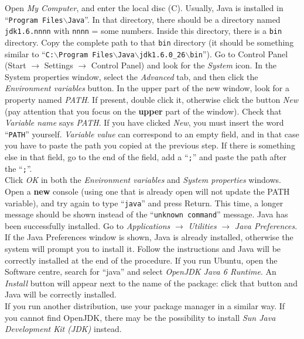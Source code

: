 \begin{enumerate}
{Open \emph{My Computer}, and enter the local disc (C). Usually, Java is installed in ``{\tt Program
Files$\backslash{}$Java}''. In that directory,
there should be a directory named {\tt jdk1.6.nnnn} with {\tt nnnn} = some numbers.
Inside this directory, there is a {\tt bin} directory. Copy the complete path to that {\tt bin} directory (it should be
something similar to
``{\tt C:$\backslash{}$Program Files$\backslash{}$Java$\backslash{}$jdk1.6.0\_{}26$\backslash{}$bin}'').
Go to Control Panel (Start $\rightarrow$ Settings $\rightarrow$ Control Panel) and look for the \emph{System} icon.
In the System properties window, select the \emph{Advanced} tab, and then click the \emph{Environment variables}
button.
In the upper part of the new window, look for a property named \emph{PATH}. If present, double click it,
otherwise click the button \emph{New} (pay attention that you focus on the {\bfseries upper} part of the window).
Check that \emph{Variable name} says \emph{PATH}. If you have clicked \emph{New}, you must insert the word ``{\tt PATH}''
yourself.
\emph{Variable value} can correspond to an empty field, and in that case you have to paste the path you copied at
the previous step.
If there is something else in that field, go to the end of the field, add a ``{\tt ;}'' and paste the path after the ``{\tt ;}''.\\
Click \emph{OK} in both the \emph{Environment variables} and \emph{System properties} windows.\\
Open a {\bfseries new} console (using one that is already open will not update the PATH variable), and try again to type
``{\tt java}'' and press Return. This time, a longer
message should be shown instead of the ``{\tt unknown command}'' message. Java has been successfully installed.}%
{Go to \emph{Applications} $\rightarrow$ \emph{Utilities} $\rightarrow$ \emph{Java Preferences}.\\
If the Java Preferences window is shown, Java is already installed, otherwise the system will prompt you to install
it. Follow the instructions and Java will be correctly installed at the end of the procedure.}%
{If you run Ubuntu, open the Software centre, search for ``java'' and select \emph{OpenJDK Java 6 Runtime}. An
\emph{Install} button
will appear next to the name of the package: click that button and Java will be correctly installed.\\
If you run another distribution, use your package manager in a similar way. If you cannot find OpenJDK, there may be
the possibility to install \emph{Sun Java Development Kit (JDK)} instead.}
\end{enumerate}


